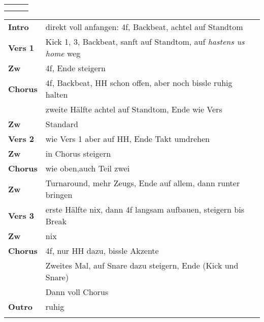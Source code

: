 

\begin{tabular}{p{0.6cm}p{12cm}p{1.4cm}}
	\rowcolor{cyan} \myRow{\thesongnumber} & \myRow{Christ Our Glory} & \myRow{152} \\
	                                       &                          &             \\
\end{tabular}

\begin{tabular}{p{1.6cm}l}
	\textbf{Intro}  & direkt voll anfangen: 4f, Backbeat, achtel auf Standtom                           \\
	\textbf{Vers 1} & Kick 1, 3, Backbeat, sanft \achtel auf Standtom, auf \textit{hastens us home} weg \\
	\textbf{Zw}     & 4f, Ende steigern                                                                 \\
	\textbf{Chorus} & 4f, Backbeat, HH schon offen, aber noch bissle ruhig halten                       \\
	                & zweite Hälfte achtel auf Standtom, Ende wie Vers                                  \\
	\textbf{Zw}     & Standard                                                                          \\
	\textbf{Vers 2} & wie Vers 1 aber auf HH, Ende Takt umdrehen                                        \\
	\textbf{Zw}     & in Chorus steigern                                                                \\
	\textbf{Chorus} & wie oben,auch Teil zwei                                                           \\
	\textbf{Zw}     & Turnaround, mehr Zeugs, Ende \viertel auf allem, dann runter bringen              \\
	\textbf{Vers 3} & erste Hälfte nix, dann 4f langsam aufbauen, steigern bis Break                    \\
	\textbf{Zw}     & nix                                                                               \\
	\textbf{Chorus} & 4f, nur HH dazu, bissle Akzente                                                   \\
	                & Zweites Mal, \viertel auf Snare dazu steigern, Ende \achtel (Kick und Snare)      \\
	                & Dann voll Chorus                                                                  \\
	\textbf{Outro}  & ruhig                                                                             \\
	                &                                                                                   \\
\end{tabular}
